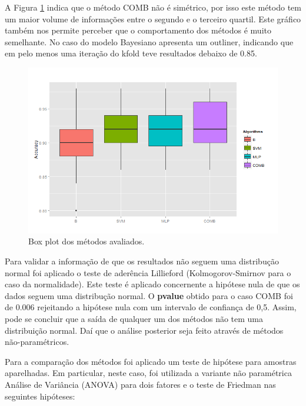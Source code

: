 \documentclass[12pt]{article}
\begin{document}
A Figura \ref{fig:boxplot_acc} indica que o método COMB não é simétrico, por isso este método tem um maior volume de informações entre o segundo e o terceiro quartil. Este gráfico também nos permite perceber que o comportamento dos métodos é muito semelhante. No caso do modelo Bayesiano apresenta um outliner, indicando que em pelo menos uma iteração do kfold teve resultados debaixo de 0.85.

\begin{figure}[!h]
\centering
\includegraphics[width=4.5in]{../out/boxplot-errors.png}
\caption{Box plot dos métodos avaliados.}
\label{fig:boxplot_acc}
\end{figure}  



Para validar a informação de que os resultados não seguem uma distribução normal foi aplicado o teste de aderência Lillieford (Kolmogorov-Smirnov para o caso da normalidade). Este teste é aplicado concernente a hipótese nula de que os dados seguem uma distribução normal. O \textbf{pvalue} obtido para o caso COMB foi de 0.006 rejeitando a hipótese  nula com um intervalo de confiança de 0,5. Assim, pode se concluir que a saída de qualquer um dos métodos não  tem uma distribuição normal. Daí que o análise posterior seja feito  através de métodos não-paramétricos.


Para a comparação dos métodos foi aplicado um teste de hipótese para amostras aparelhadas. Em particular, neste caso, foi utilizada a variante não paramétrica Análise de Variância (ANOVA) para dois fatores e o teste de Friedman nas seguintes hipóteses:
\end{document}
